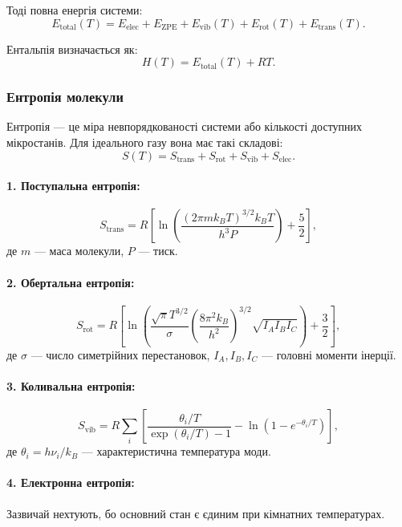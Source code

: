 {Тоді повна енергія системи:
\begin{equation*}
    E_{\text{total}}(T) = E_{\text{elec}} + E_{\text{ZPE}} + E_{\text{vib}}(T)
    + E_{\text{rot}}(T) + E_{\text{trans}}(T).
\end{equation*}

Ентальпія визначається як:
\begin{equation*}
    H(T) = E_{\text{total}}(T) + RT.
\end{equation*}

\subsubsection{Ентропія молекули}

Ентропія --- це міра невпорядкованості системи або кількості доступних мікростанів.
Для ідеального газу вона має такі складові:
\[
    S(T) = S_{\text{trans}} + S_{\text{rot}} + S_{\text{vib}} + S_{\text{elec}}.
\]

\paragraph{1. Поступальна ентропія:}
\[
    S_{\text{trans}} = R\left[
        \ln\!\left(\frac{(2\pi m k_BT)^{3/2}k_BT}{h^3 P}\right) + \frac{5}{2}
    \right],
\]
де $m$ --- маса молекули, $P$ --- тиск.

\paragraph{2. Обертальна ентропія:}
\[
    S_{\text{rot}} = R\left[
        \ln\!\left(
        \frac{\sqrt{\pi}T^{3/2}}{\sigma}
        \left(\frac{8\pi^2k_B}{h^2}\right)^{3/2}
        \sqrt{I_A I_B I_C}
        \right) + \frac{3}{2}
    \right],
\]
де $\sigma$ --- число симетрійних перестановок, $I_A,I_B,I_C$ --- головні моменти інерції.

\paragraph{3. Коливальна ентропія:}
\[
    S_{\text{vib}} = R \sum_i
        \left[
            \frac{\theta_i/T}{\exp(\theta_i/T) - 1}
            - \ln\!\left(1 - e^{-\theta_i/T}\right)
        \right],
\]
де $\theta_i = h\nu_i/k_B$ --- характеристична температура моди.

\paragraph{4. Електронна ентропія:}
Зазвичай нехтують, бо основний стан є єдиним при кімнатних температурах.


}
